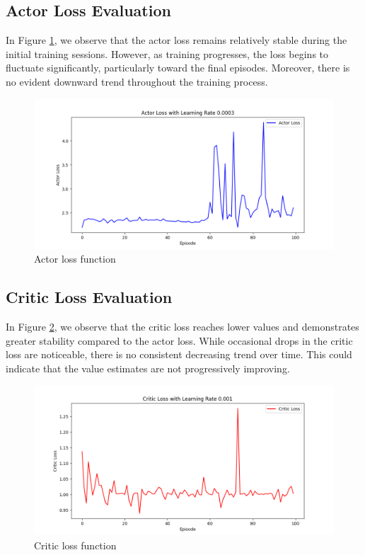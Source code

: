 \documentclass{article}
\begin{document}
\subsection{Actor Loss Evaluation}

In Figure \ref{fig:actor}, we observe that the actor loss remains relatively stable during the initial training sessions. However, as training progresses, the loss begins to fluctuate significantly, particularly toward the final episodes. Moreover, there is no evident downward trend throughout the training process.

\begin{figure}[h!]
    \centering
    \includegraphics[width=1\linewidth]{assets/actor.png}
    \caption{Actor loss function}
    \label{fig:actor}
\end{figure}

\subsection{Critic Loss Evaluation}

In Figure \ref{fig:critic}, we observe that the critic loss reaches lower values and demonstrates greater stability compared to the actor loss. While occasional drops in the critic loss are noticeable, there is no consistent decreasing trend over time. This could indicate that the value estimates are not progressively improving.

\begin{figure}[h!]
    \centering
    \includegraphics[width=1\linewidth]{assets/critic.png}
    \caption{Critic loss function}
    \label{fig:critic}
\end{figure}
\end{document}

